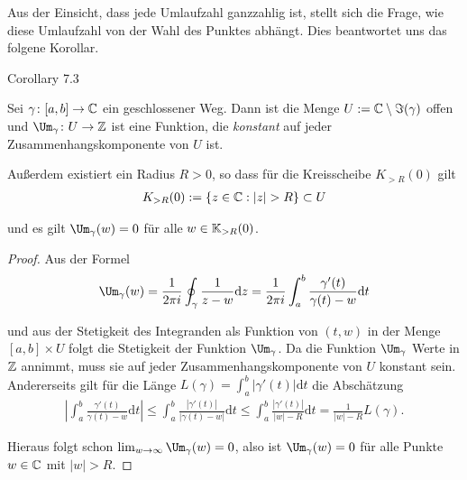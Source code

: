 \par
Aus der Einsicht, dass jede Umlaufzahl ganzzahlig ist, stellt sich die Frage, wie diese Umlaufzahl von der Wahl des Punktes abhängt.
Dies beantwortet uns das folgene Korollar.
\label{complexanalysis/residuensatz:corollary-11}
\begin{emphBox}{}{}{Corollary 7.3}



\par
Sei \(\gamma \colon [a,b] \rightarrow \mathbb{C}\) ein geschlossener Weg.
Dann ist die Menge \(U := \mathbb{C} \setminus \Im(\gamma)\) offen und \(\Um_\gamma \colon U \rightarrow \Z\) ist eine Funktion, die \emph{konstant} auf jeder Zusammenhangskomponente von \(U\) ist.

\par
Außerdem existiert ein Radius \(R > 0\), so dass für die Kreisscheibe \(K_{>R}(0)\) gilt
\begin{align*}
K_{>R}(0) := \lbrace z \in \mathbb{C} : |z| > R \rbrace \subset U
\end{align*}
\par
und es gilt \(\Um_\gamma(w) = 0\) für alle \(w \in \mathbb{K}_{>R}(0)\).
\end{emphBox}

\begin{proof}
 Aus der Formel
\begin{align*}
\Um_\gamma(w) = \frac{1}{2 \pi i} \oint_\gamma \frac{1}{z-w} \mathrm{d}z = \frac{1}{2 \pi i} \int_a^b \frac{\gamma'(t)}{\gamma(t) - w} \mathrm{d}t
\end{align*}
\par
und aus der Stetigkeit des Integranden als Funktion von \((t,w)\) in der Menge \([a,b] \times U\) folgt die Stetigkeit der Funktion \(\Um_\gamma\).
Da die Funktion \(\Um_\gamma\) Werte in \(\mathbb{Z}\) annimmt, muss sie auf jeder Zusammenhangskomponente von \(U\) konstant sein.
Andererseits gilt für die Länge \(L(\gamma) = \int_a^b |\gamma'(t)| \mathrm{d}t\) die Abschätzung
\begin{align*}
\left| \int_a^b \frac{\gamma'(t)}{\gamma(t)-w} \mathrm{d}t \right| \leq \int_a^b \frac{|\gamma'(t)|}{|\gamma(t) - w|} \mathrm{d}t \leq \int_a^b \frac{|\gamma'(t)|}{|w| - R} \mathrm{d}t = \frac{1}{|w| - R} L(\gamma).\end{align*}
\par
Hieraus folgt schon \(\lim_{w \rightarrow \infty} \Um_\gamma(w) = 0\), also ist \(\Um_\gamma(w) = 0\) für alle Punkte \(w \in \mathbb{C}\) mit \(|w| > R\).
\end{proof}


